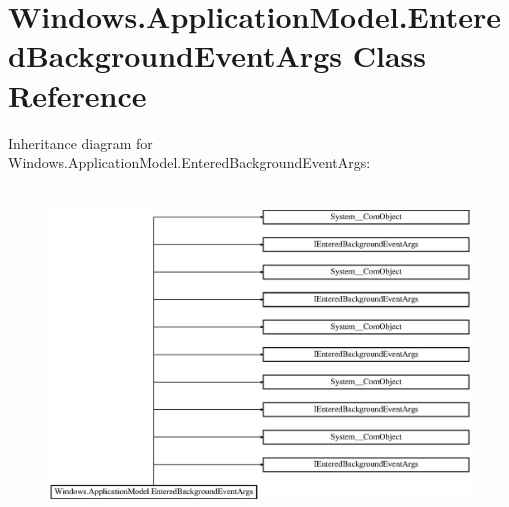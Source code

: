 \hypertarget{class_windows_1_1_application_model_1_1_entered_background_event_args}{}\section{Windows.\+Application\+Model.\+Entered\+Background\+Event\+Args Class Reference}
\label{class_windows_1_1_application_model_1_1_entered_background_event_args}
Inheritance diagram for Windows.\+Application\+Model.\+Entered\+Background\+Event\+Args\+:\begin{figure}[H]
\begin{center}
\leavevmode
\includegraphics[height=8.876081cm]{class_windows_1_1_application_model_1_1_entered_background_event_args}
\end{center}
\end{figure}

